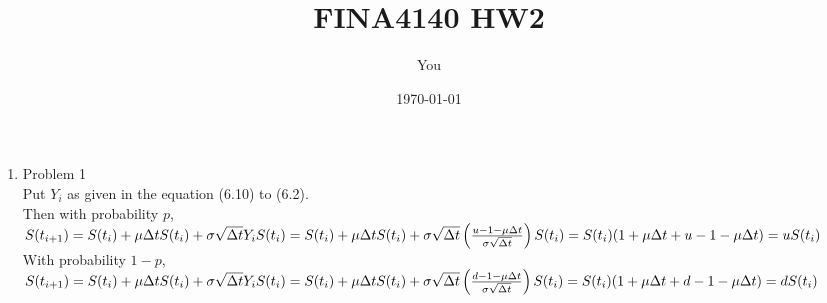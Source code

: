 \documentclass[a4paper]{article}
\title{FINA4140 HW2}
\author{You}
\date{\today}
\def\dd{\Delta}
\def\lb{\left(}
\def\rb{\right)}
\begin{document}
\begin{enumerate}
\item Problem 1\\
Put $Y_i$ as given in the equation (6.10) to (6.2).\\
Then with probability $p$,\\
\begin{math}
S(t_{i+1})\\
=S(t_i)+\mu\dd tS(t_i)+\sigma\sqrt{\dd t}Y_iS(t_i)\\
=S(t_i)+\mu\dd tS(t_i)+\sigma\sqrt{\dd t}\lb\frac{u-1-\mu\dd t}{\sigma\sqrt{\dd t}}\rb S(t_i)\\
=S(t_i)(1+\mu\dd t+u-1-\mu\dd t)\\
=uS(t_i)
\end{math}\\
With probability $1-p$,\\
\begin{math}
S(t_{i+1})\\
=S(t_i)+\mu\dd tS(t_i)+\sigma\sqrt{\dd t}Y_iS(t_i)\\
=S(t_i)+\mu\dd tS(t_i)+\sigma\sqrt{\dd t}\lb\frac{d-1-\mu\dd t}{\sigma\sqrt{\dd t}}\rb S(t_i)\\
=S(t_i)(1+\mu\dd t+d-1-\mu\dd t)\\
=dS(t_i)
\end{math}\\

\pagebreak


\end{enumerate}
\end{document}
